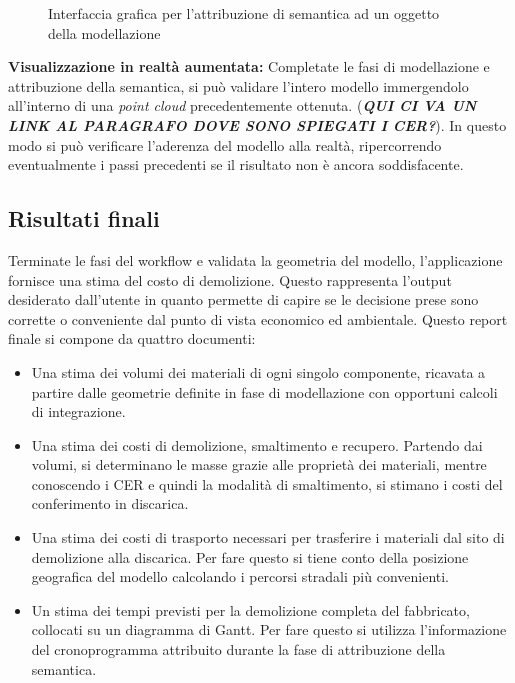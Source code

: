 \begin{figure}[!h]
  \centering
   {}
  \caption{Interfaccia grafica per l'attribuzione di semantica ad un oggetto della modellazione}
  \label{fig:example1}
\end{figure}

\noindent \textbf{Visualizzazione in realt\`a aumentata:} Completate le fasi di modellazione e attribuzione della semantica, si pu\`o validare l'intero modello immergendolo all'interno di una \textit{point cloud} precedentemente ottenuta. (\textbf{\textit{QUI CI VA UN LINK AL PARAGRAFO DOVE SONO SPIEGATI I CER?}}). In questo modo si pu\`o verificare l'aderenza del modello alla realt\`a, ripercorrendo eventualmente i passi precedenti se il risultato non \`e ancora soddisfacente.\\

\subsection{Risultati finali}

\noindent Terminate le fasi del workflow e validata la geometria del modello, l'applicazione fornisce una stima del costo di demolizione. Questo rappresenta l'output desiderato dall'utente in quanto permette di capire se le decisione prese sono corrette o conveniente dal punto di vista economico ed ambientale. Questo report finale si compone da quattro documenti:
\begin{itemize}
 \item Una stima dei volumi dei materiali di ogni singolo componente, ricavata a partire dalle geometrie definite in fase di modellazione con opportuni calcoli di integrazione.
 \item Una stima dei costi di demolizione, smaltimento e recupero. Partendo dai volumi, si determinano le masse grazie alle propriet\`a dei materiali, mentre conoscendo i CER e quindi la modalit\`a di smaltimento, si stimano i costi del conferimento in discarica.
 \item Una stima dei costi di trasporto necessari per trasferire i materiali dal sito di demolizione alla discarica. Per fare questo si tiene conto della posizione geografica del modello calcolando i percorsi stradali pi\`u convenienti.
 \item Un stima dei tempi previsti per la demolizione completa del fabbricato, collocati su un diagramma di Gantt. Per fare questo si utilizza l'informazione del cronoprogramma attribuito durante la fase di attribuzione della semantica.

\end{itemize}


\noindent